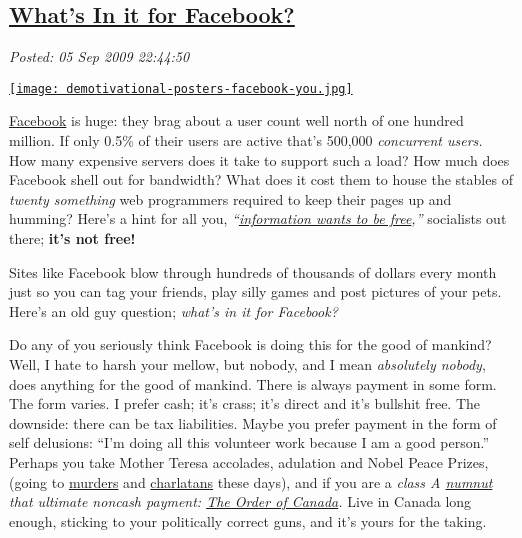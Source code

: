 %

\subsection*{\href{http://bakerjd99.wordpress.com/2009/09/05/whats-in-it-for-facebook/}{What's In it for Facebook?}}


\noindent\emph{Posted: 05 Sep 2009 22:44:50}
\vspace{6pt}

\begin{floatingfigure}[l]{0.40\textwidth}
\centering
\href{http://verydemotivational.memebase.com/}{\texttt{[image: demotivational-posters-facebook-you.jpg]}}
\label{fig:3X0}
\end{floatingfigure}
\href{http://www.facebook.com}{Facebook} is
huge: they brag about a user count well north of one hundred million. If
only 0.5\% of their users are active that's 500,000 \emph{concurrent users.}
How many expensive servers does it take to
support such a load? How much does Facebook shell out for bandwidth?
What does it cost them to house the stables of \emph{twenty something}
web programmers required to keep their pages up and humming? Here's a
hint for all you,
\emph{``\href{http://en.wikipedia.org/wiki/Information\_wants\_to\_be\_free}{information
wants to be free},''} socialists out there; \textbf{it's not free!}

Sites like Facebook blow through hundreds of thousands of dollars every
month just so you can tag your friends, play silly games and post
pictures of your pets. Here's an old guy question; \emph{what's in it
for Facebook?}

Do any of you seriously think Facebook is doing this for the good of
mankind? Well, I hate to harsh your mellow, but nobody, and I mean
\emph{absolutely nobody}, does anything for the good of mankind. There
is always payment in some form. The form varies. I prefer cash; it's
crass; it's direct and it's bullshit free. The downside: there can be
tax liabilities. Maybe you prefer payment in the form of self delusions:
``I'm doing all this volunteer work because I am a good person.''
Perhaps you take Mother Teresa accolades, adulation and Nobel Peace
Prizes, (going to
\href{http://nobelprize.org/nobel\_prizes/peace/laureates/1994/arafat-bio.html}{murders}
and
\href{http://nobelprize.org/nobel\_prizes/peace/laureates/2007/}{charlatans}
these days), and if you are a \emph{class A
\href{http://www.urbandictionary.com/define.php?term=numnut}{numnut}
that ultimate noncash payment:
\href{http://www.gg.ca/honours/nat-ord/oc/index\_e.asp}{The Order of
Canada}.} Live in Canada long enough, sticking to your politically
correct guns, and it's yours for the taking.

